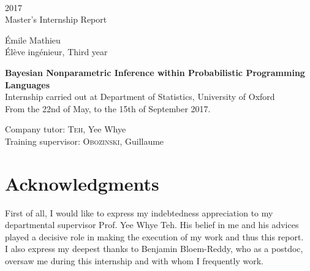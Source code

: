 \documentclass[twoside,10pt,openany,a4paper]{rapport}
\begin{document}
\begin{titlepage}
\begin{center}
      
      \vspace{0.3cm}
      \\
      
      \vspace{0.7cm}
      2017\\
      Master's Internship Report
      
      \vspace{0.3cm}
      Émile Mathieu\\
      Élève ingénieur, Third year
      
      \vspace{2cm}
      \Huge{\textbf{Bayesian Nonparametric Inference within Probabilistic Programming Languages}}\\

      
      \vfill
      \normalsize{}
      Internship carried out at Department of Statistics, University of Oxford \\
      From the 22nd of May, to the 15th of September 2017.
      
      \vspace{0.3cm}
       Company tutor: \textsc{Teh}, Yee Whye\\
       Training supervisor: \textsc{Obozinski}, Guillaume

      \end{center}
\end{titlepage}

\cleardoublepage


\chapter{Acknowledgments}

\quad First of all, I would like to express my indebtedness appreciation to my departmental supervisor Prof. Yee Whye Teh. His belief in me and his advices played a decisive role in making the execution of my work and thus this report. \\

I also express my deepest thanks to Benjamin Bloem-Reddy, who as a postdoc, oversaw me during this internship and with whom I frequently work. \\
\end{document}
